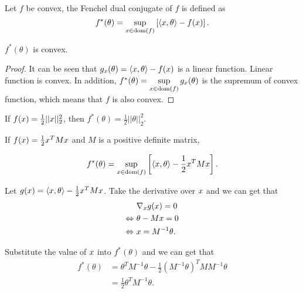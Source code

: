 \documentclass[../main.tex]{subfiles}
\begin{document}
\begin{definition}
	Let $f$ be convex, the Fenchel dual conjugate of $f$ is defined as
	\begin{equation}
		f^*(\theta) = \sup\limits_{x\in \textmd{dom}(f)} \left[ \langle x, \theta \rangle - f(x)\right].
	\end{equation}
\end{definition}

\begin{claim}
	$f^*(\theta)$ is convex.
\end{claim}

\begin{proof}
	It can be seen that $ g_x(\theta) = \langle x, \theta \rangle - f(x)$ is a linear function. Linear function is convex. In addition, $f^*(\theta) = \sup\limits_{x\in \textmd{dom}(f)} g_x(\theta)$ is the supremum of convex function, which means that $f$ is also convex.  
\end{proof}

\begin{example}
	If $f(x) = \frac{1}{2} ||x||_2^2$, then $f^*(\theta) = \frac{1}{2} ||\theta||_2^2$.
\end{example}

\begin{example}
	If $f(x) = \frac{1}{2}x^T M x$ and $M$ is a positive definite matrix, 
	
	\begin{equation*}
	f^*(\theta) = \sup\limits_{x\in \textmd{dom}(f)} \left[ \langle x, \theta \rangle -  \frac{1}{2}x^T M x \right].
	\end{equation*}
	
	Let $g(x) =\langle x, \theta \rangle -  \frac{1}{2}x^T M x $. Take the derivative over $x$ and we can get that
	\begin{equation*}
	\begin{aligned}
		&	\nabla_x g(x) = 0\\
	\Leftrightarrow\ & \theta - M x = 0\\
	\Leftrightarrow\ & x = M^{-1} \theta. 
	\end{aligned}
	\end{equation*}
	
	Substitute the value of $x$ into $f^*(\theta)$ and we can get that 
	\begin{equation*}
		\begin{aligned}
				f^*(\theta) &= \theta^T M^{-1}\theta - \frac{1}{2} (M^{-1}\theta)^T M M^{-1}\theta\\
							&= \frac{1}{2} \theta^T M^{-1} \theta.
		\end{aligned}
	\end{equation*}
\end{example}
\end{document}
